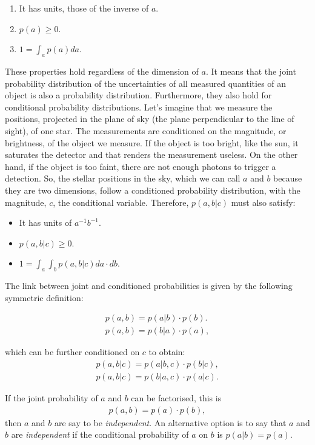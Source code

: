 \begin{enumerate}[label=\textbf{Property \arabic*}]
\item  It has units, those of the inverse of $a$. \label{property:1}
\item $p(a) \geq 0$. \label{property:3}
\item $1=\int_a p(a) da$. \label{property:3}
\end{enumerate}

These properties hold regardless of the dimension of $a$. It means that the joint probability distribution of the uncertainties of all measured quantities of an object is also a probability distribution. Furthermore, they also hold for conditional probability distributions. Let's imagine that we measure the positions, projected in the plane of sky (the plane perpendicular to the line of sight), of one star. The measurements are conditioned on the magnitude, or brightness, of the object we measure. If the object is too bright, like the sun, it saturates the detector and that renders the measurement useless. On the other hand, if the object is too faint, there are not enough photons to trigger a detection. So, the stellar positions in the sky, which we can call $a$ and $b$ because they are two dimensions, follow a conditioned probability distribution, with the magnitude, $c$, the conditional variable. Therefore, $p(a,b|c)$ must also satisfy:

\begin{itemize}
\item It has units of $a^{-1} b^{-1}$.
\item $p(a,b|c)\geq0$.
\item $1=\int_a \int_b p(a,b|c)da\cdot db$.
\end{itemize}

The link between joint and conditioned probabilities is given by the following symmetric definition:

\begin{align}
p(a,b)=p(a|b)\cdot p(b).\nonumber \\
p(a,b)=p(b|a) \cdot p(a),
\end{align}

which can be further conditioned on $c$ to obtain:
\begin{align}
\label{eq:conditioned}
p(a,b|c)=p(a|b,c)\cdot p(b|c),\nonumber \\
p(a,b|c)=p(b|a,c) \cdot p(a|c).
\end{align}

If the joint probability of $a$ and $b$ can be factorised, this is
\begin{align}
p(a,b)=p(a)\cdot p(b),
\end{align}
then $a$ and $b$ are say to be \emph{independent}. An alternative option is to say that $a$ and $b$ are \emph{independent} if the conditional probability of $a$ on $b$ is $p(a|b)=p(a)$.


